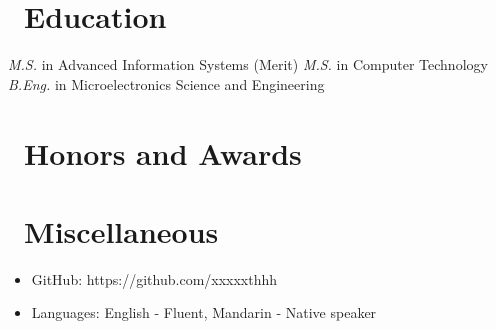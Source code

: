 \documentclass{resume}
\begin{document}
\section{\faGraduationCap\ Education}
\textit{M.S.} in Advanced Information Systems (Merit)
\textit{M.S.} in Computer Technology
\textit{B.Eng.} in Microelectronics Science and Engineering

\section{\faHeartO\ Honors and Awards}

\section{\faInfo\ Miscellaneous}
\begin{itemize}[parsep=0.5ex]
  \item GitHub: https://github.com/xxxxxthhh
  \item Languages: English - Fluent, Mandarin - Native speaker
\end{itemize}

%
%
\end{document}
